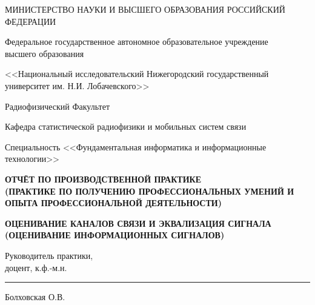 \documentclass[a4paper,14pt]{extarticle}
\begin{document}
\begin{titlepage}
    \thispagestyle{empty}

   
    \begin{center}
        {\small
        МИНИСТЕРСТВО НАУКИ И ВЫСШЕГО ОБРАЗОВАНИЯ РОССИЙСКИЙ\\
        ФЕДЕРАЦИИ\par}
        \vspace{0.5cm}

        {\small
        Федеральное государственное автономное образовательное учреждение\\
        высшего образования\par}
        \vspace{0.3cm}

        {\small
        <<Национальный исследовательский Нижегородский государственный\\
        университет им. Н.И. Лобачевского>>\par}
        \vspace{0.5cm}

        {\small Радиофизический Факультет\par}
        \vspace{0.2cm}
        {\small Кафедра статистической радиофизики и мобильных систем связи\par}
        \vspace{0.2cm}
        {\small Специальность <<Фундаментальная информатика и информационные технологии>>\par}

        \vspace{1.5cm}

        
        {\bfseries\small
        ОТЧЁТ ПО ПРОИЗВОДСТВЕННОЙ ПРАКТИКЕ\\
        (ПРАКТИКЕ ПО ПОЛУЧЕНИЮ ПРОФЕССИОНАЛЬНЫХ УМЕНИЙ И\\
        ОПЫТА ПРОФЕССИОНАЛЬНОЙ ДЕЯТЕЛЬНОСТИ)\par}

        \vspace{0.8cm}

        {\bfseries\large
        ОЦЕНИВАНИЕ КАНАЛОВ СВЯЗИ И ЭКВАЛИЗАЦИЯ СИГНАЛА 
        (ОЦЕНИВАНИЕ ИНФОРМАЦИОННЫХ СИГНАЛОВ)\par}

        \vspace{2.5cm}
    \end{center}

   
    \begin{flushleft}
        \hspace{1.5cm}
        \begin{minipage}{0.85\textwidth}
            \small
            Руководитель практики,\\
            доцент, к.ф.-м.н.
            \hfill
            \rule{4cm}{0.4pt} Болховская О.В.
            

\end{minipage}
\end{flushleft}
\end{titlepage}
\end{document}
